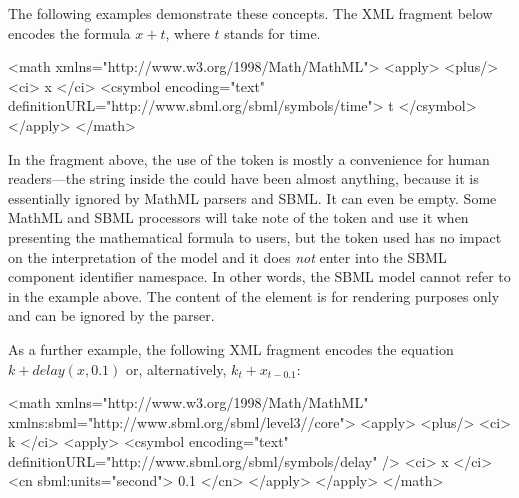 \begin{itemize}

\end{itemize}

The following examples demonstrate these concepts.  The XML fragment below
encodes the formula $x + t$, where $t$ stands for time.

\begin{example}
<math xmlns="http://www.w3.org/1998/Math/MathML">
    <apply>
        <plus/>
        <ci> x </ci>
        <csymbol encoding="text" definitionURL="http://www.sbml.org/sbml/symbols/time">
            t
        </csymbol>
    </apply>
</math>
\end{example}


In the fragment above, the use of the token  is mostly a
convenience for human readers---the string inside the
 could have been almost anything, because it is
essentially ignored by MathML parsers and SBML.  It can
  even be empty.  Some MathML and SBML processors will take note
of the token and use it when presenting the mathematical formula
to users, but the token used has no impact on the interpretation
of the model and it does \emph{not} enter into the SBML component
identifier namespace.  In other words, the SBML model cannot refer
to  in the example above.  The content of the
 element is for rendering purposes only and can be
ignored by the parser.

As a further example, the following XML fragment encodes the equation
$k + delay(x, 0.1)$ or, alternatively, $k_t + x_{t - 0.1}$:

\reltwo{\clearpage}
\begin{example}
<math xmlns="http://www.w3.org/1998/Math/MathML"
      xmlns:sbml="http://www.sbml.org/sbml/level3//core">
    <apply>
        <plus/>
        <ci> k </ci>
        <apply>
            <csymbol encoding="text" definitionURL="http://www.sbml.org/sbml/symbols/delay" />
            <ci> x </ci>
            <cn sbml:units="second"> 0.1 </cn>
        </apply>
    </apply>
</math>
\end{example}

